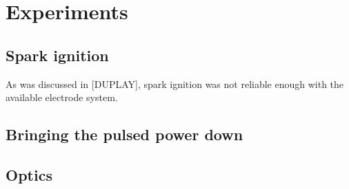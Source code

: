 \chapter{Experiments}

    \section{Spark ignition}
        As was discussed in [DUPLAY], spark ignition was not reliable enough with the available electrode system. 

    \section{Bringing the pulsed power down}

    \section{Optics} \label{sec:design_optics}

